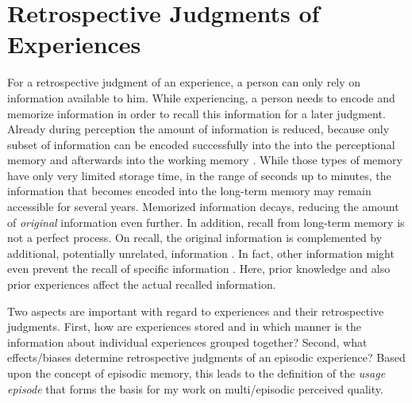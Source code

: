 \section{Retrospective Judgments of Experiences}\label{chap:03}
For a retrospective judgment of an experience, a person can only rely on information available to him.
While experiencing, a person needs to encode and memorize information in order to recall this information for a later judgment.
Already during perception the amount of information is reduced, because only subset of information can be encoded successfully into the into the perceptional memory and afterwards into the working memory \citep[][p.\,8f.]{raake_speech_2006}.
While those types of memory have only very limited storage time, in the range of seconds up to minutes, the information that becomes encoded into the long-term memory may remain accessible for several years.
Memorized information decays, reducing the amount of \emph{original} information even further.
In addition, recall from long-term memory is not a perfect process.
On recall, the original information is complemented by additional, potentially unrelated, information \citep[\cf,][]{schacter_seven_2003}.
In fact, other information might even prevent the recall of specific information \citep[\cf,][]{schacter_seven_2003}.
Here, prior knowledge and also prior experiences affect the actual recalled information.

Two aspects are important with regard to experiences and their retrospective judgments.
First, how are experiences stored and in which manner is the information about individual experiences grouped together?
Second, what effects/biases determine retrospective judgments of an episodic experience?
Based upon the concept of episodic memory, this leads to the definition of the \emph{usage episode} that forms the basis for my work on multi\-/episodic perceived quality.

